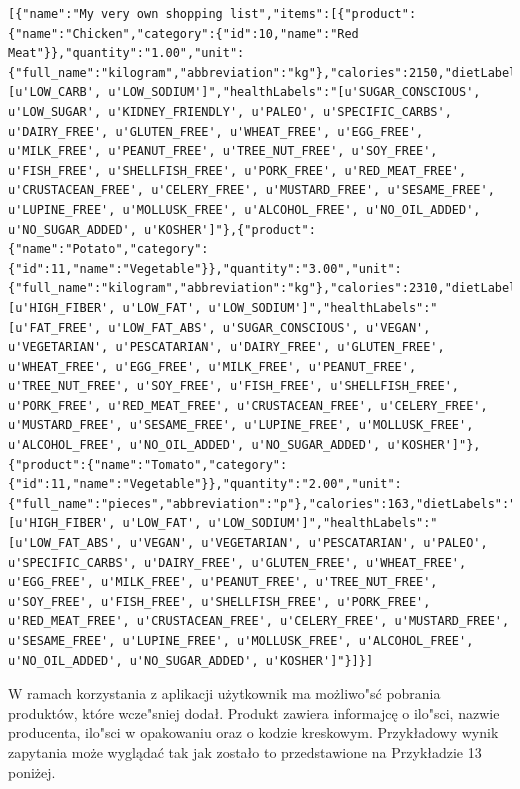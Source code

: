 \documentclass{article}
\begin{document}
\begin{lstlisting}[label=shoppinglist_api,caption=Pobranie listy zakupowej,breaklines=true]
[{"name":"My very own shopping list","items":[{"product":{"name":"Chicken","category":{"id":10,"name":"Red Meat"}},"quantity":"1.00","unit":{"full_name":"kilogram","abbreviation":"kg"},"calories":2150,"dietLabels":"[u'LOW_CARB', u'LOW_SODIUM']","healthLabels":"[u'SUGAR_CONSCIOUS', u'LOW_SUGAR', u'KIDNEY_FRIENDLY', u'PALEO', u'SPECIFIC_CARBS', u'DAIRY_FREE', u'GLUTEN_FREE', u'WHEAT_FREE', u'EGG_FREE', u'MILK_FREE', u'PEANUT_FREE', u'TREE_NUT_FREE', u'SOY_FREE', u'FISH_FREE', u'SHELLFISH_FREE', u'PORK_FREE', u'RED_MEAT_FREE', u'CRUSTACEAN_FREE', u'CELERY_FREE', u'MUSTARD_FREE', u'SESAME_FREE', u'LUPINE_FREE', u'MOLLUSK_FREE', u'ALCOHOL_FREE', u'NO_OIL_ADDED', u'NO_SUGAR_ADDED', u'KOSHER']"},{"product":{"name":"Potato","category":{"id":11,"name":"Vegetable"}},"quantity":"3.00","unit":{"full_name":"kilogram","abbreviation":"kg"},"calories":2310,"dietLabels":"[u'HIGH_FIBER', u'LOW_FAT', u'LOW_SODIUM']","healthLabels":"[u'FAT_FREE', u'LOW_FAT_ABS', u'SUGAR_CONSCIOUS', u'VEGAN', u'VEGETARIAN', u'PESCATARIAN', u'DAIRY_FREE', u'GLUTEN_FREE', u'WHEAT_FREE', u'EGG_FREE', u'MILK_FREE', u'PEANUT_FREE', u'TREE_NUT_FREE', u'SOY_FREE', u'FISH_FREE', u'SHELLFISH_FREE', u'PORK_FREE', u'RED_MEAT_FREE', u'CRUSTACEAN_FREE', u'CELERY_FREE', u'MUSTARD_FREE', u'SESAME_FREE', u'LUPINE_FREE', u'MOLLUSK_FREE', u'ALCOHOL_FREE', u'NO_OIL_ADDED', u'NO_SUGAR_ADDED', u'KOSHER']"},{"product":{"name":"Tomato","category":{"id":11,"name":"Vegetable"}},"quantity":"2.00","unit":{"full_name":"pieces","abbreviation":"p"},"calories":163,"dietLabels":"[u'HIGH_FIBER', u'LOW_FAT', u'LOW_SODIUM']","healthLabels":"[u'LOW_FAT_ABS', u'VEGAN', u'VEGETARIAN', u'PESCATARIAN', u'PALEO', u'SPECIFIC_CARBS', u'DAIRY_FREE', u'GLUTEN_FREE', u'WHEAT_FREE', u'EGG_FREE', u'MILK_FREE', u'PEANUT_FREE', u'TREE_NUT_FREE', u'SOY_FREE', u'FISH_FREE', u'SHELLFISH_FREE', u'PORK_FREE', u'RED_MEAT_FREE', u'CRUSTACEAN_FREE', u'CELERY_FREE', u'MUSTARD_FREE', u'SESAME_FREE', u'LUPINE_FREE', u'MOLLUSK_FREE', u'ALCOHOL_FREE', u'NO_OIL_ADDED', u'NO_SUGAR_ADDED', u'KOSHER']"}]}]
\end{lstlisting}

W ramach korzystania z aplikacji użytkownik ma możliwo"sć pobrania produktów, które wcze"sniej dodał. Produkt zawiera informajcę o ilo"sci, nazwie producenta, ilo"sci w opakowaniu oraz o kodzie kreskowym. Przykładowy wynik zapytania może wyglądać tak jak zostało to przedstawione na Przykładzie 13 poniżej.
\end{document}
